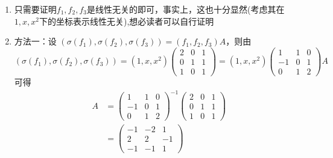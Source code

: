 \documentclass[12pt,fontset=fandol]{ctexart}
\begin{document}
\begin{solve}
\begin{enumerate}
                \item 只需要证明$f_1,f_2,f_3$是线性无关的即可，事实上，这也十分显然(考虑其在$1,x,x^2$下的坐标表示线性无关),想必读者可以自行证明

                \item 方法一：设 $ (\sigma(f_1), \sigma(f_2), \sigma(f_3)) = (f_1, f_2, f_3) A $，则由
                      \[ (\sigma(f_1), \sigma(f_2), \sigma(f_3)) = (1, x, x^2) \begin{pmatrix}
                              2 & 0 & 1 \\
                              0 & 1 & 1 \\
                              1 & 0 & 1
                          \end{pmatrix} = (1, x, x^2) \begin{pmatrix}
                              1  & 1 & 0 \\
                              -1 & 0 & 1 \\
                              0  & 1 & 2
                          \end{pmatrix} A \]
                      可得
                      \begin{align*}
                          A & = \begin{pmatrix}
                                    1  & 1 & 0 \\
                                    -1 & 0 & 1 \\
                                    0  & 1 & 2
                                \end{pmatrix}^{-1}
                          \begin{pmatrix}
                              2 & 0 & 1 \\
                              0 & 1 & 1 \\
                              1 & 0 & 1
                          \end{pmatrix}           \\
                            & = \begin{pmatrix}
                                    -1 & -2 & 1  \\
                                    2  & 2  & -1 \\
                                    -1 & -1 & 1
                                \end{pmatrix}

\end{align*}
\end{enumerate}
\end{solve}
\end{document}
